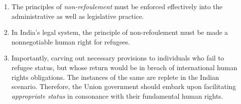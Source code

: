 \begin{multicols}{2}
\begin{enumerate}[label=$\bullet$]
\item The principles of \textit{non-refoulement} must be enforced effectively into the administrative
as well as legislative practice.

\item In India's legal system, the principle of non-refoulement must be made a nonnegotiable human right for refugees.

\item Importantly, carving out necessary provisions to individuals who fail to refugee status,
but whose return would be in breach of international human rights obligations. The
instances of the same are replete in the Indian scenario. Therefore, the Union
government should embark upon facilitating \textit{appropriate status} in consonance with
their fundamental human rights.
\end{enumerate}

\end{multicols}
\label{end2019-art1}
